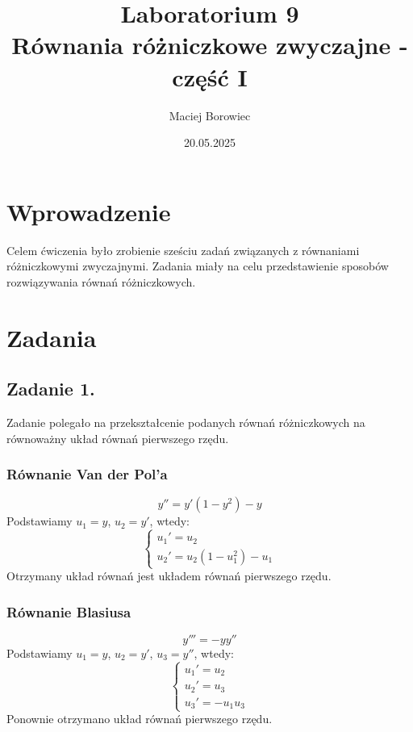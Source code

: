 \documentclass{article}
\title{Laboratorium 9 \\ Równania różniczkowe zwyczajne - część I}
\author{Maciej Borowiec}
\date{20.05.2025}
\begin{document}
\maketitle

\section{Wprowadzenie}
Celem ćwiczenia było zrobienie sześciu zadań związanych z równaniami różniczkowymi zwyczajnymi. Zadania miały na celu przedstawienie sposobów rozwiązywania równań różniczkowych.

\section{Zadania}

\subsection{Zadanie 1.}
Zadanie polegało na przekształcenie podanych równań różniczkowych na równoważny układ równań pierwszego rzędu.

\subsubsection{Równanie Van der Pol'a}
$$ y'' = y'(1- y^2) - y $$
Podstawiamy $u_1 = y$, $u_2 = y'$, wtedy:
\begin{equation}
    \begin{cases}
        u_1' = u_2 \\
        u_2' = u_2(1-u_1^2)-u_1
    \end{cases} \nonumber
\end{equation}
Otrzymany układ równań jest układem równań pierwszego rzędu.

\subsubsection{Równanie Blasiusa}
$$ y''' = -yy'' $$
Podstawiamy $u_1 = y$, $u_2 = y'$, $u_3 = y''$, wtedy:
\begin{equation}
    \begin{cases}
        u_1' = u_2 \\
        u_2' = u_3 \\
        u_3' = -u_1u_3
    \end{cases} \nonumber
\end{equation}
Ponownie otrzymano układ równań pierwszego rzędu.
\end{document}
